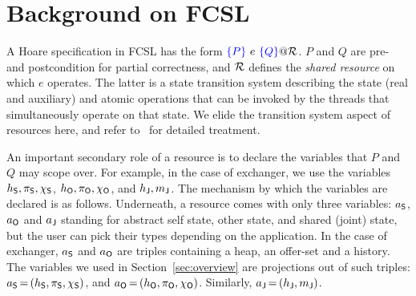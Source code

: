 \section{Background on FCSL}
\label{sec:background}


A Hoare specification in FCSL has the form $\textcolor{blue}{\left\{{P}\right\}}\ e\ \textcolor{blue}{\left\{{Q}\right\}} @
\mathcal{R}$. $P$ and $Q$ are pre- and postcondition for partial
correctness, and $\mathcal{R}$ defines the \emph{shared resource} on which
$e$ operates. 
%
%
The latter is a state transition system describing the state (real and
auxiliary) and atomic operations that can be invoked by the threads
that simultaneously operate on that state. We elide the transition
system aspect of resources here, and refer
to~\cite{Nanevski-al:ESOP14} for detailed treatment.

An important secondary role of a resource is to declare the variables
that $P$ and $Q$ may scope over. For example, in the case of
exchanger, we use the variables $h_{\mathsf{S}}, \pi_{\mathsf{S}}, \chi_{\mathsf{S}}$, $h_{\mathsf{O}},
\pi_{\mathsf{O}}, \chi_{\mathsf{O}}$, and $h_{\mathsf{J}}, {m_{\mathsf{J}}}$.
%
The mechanism by which the variables are declared is as
follows. Underneath, a resource comes with only three variables:
$a_{\mathsf{S}}$, $a_{\mathsf{O}}$ and $a_{\mathsf{J}}$ standing for abstract self state,
other state, and shared (joint) state, but the user can pick their
types depending on the application. In the case of exchanger, $a_{\mathsf{S}}$
and $a_{\mathsf{O}}$ are triples containing a heap, an offer-set and a
history. The variables we used in Section~\ref{sec:overview} are
projections out of such triples: $a_{\mathsf{S}}\,{=}\,(h_{\mathsf{S}}, \pi_{\mathsf{S}},
\chi_{\mathsf{S}})$, and $a_{\mathsf{O}}\,{=}\,(h_{\mathsf{O}}, \pi_{\mathsf{O}}, \chi_{\mathsf{O}})$. Similarly,
$a_{\mathsf{J}}\,{=}\,(h_{\mathsf{J}}, {m_{\mathsf{J}}})$.

